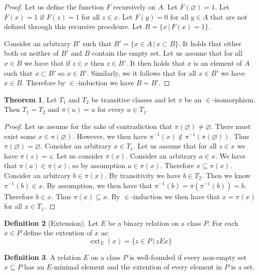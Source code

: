 \documentclass{article}
\theoremstyle{definition}
\newtheorem{thm}{Theorem}[section]
\newtheorem{defn}[thm]{Definition}
\newcommand*{\mtset}{\ensuremath{\varnothing}}
\DeclareMathOperator{\ext}{ext}
\begin{document}
\begin{proof}
    Let us define the function $F$ recursively on $A$. Let $F(\mtset) = 1$. Let $F(x) = 1$ if $F(z) = 1$ for all $z \in x$. Let $F(y) = 0$ for all $y \in A$ that are not defined through this recursive procdeure. Let $B = \{ x \, | \, F(x) = 1 \}$.

    Consider an arbitrary $B'$ such that $B' = \{ x \in A \, | \, x \subset B \}$. It holds that either both or neither of $B'$ and $B$ contain the empty set. Let us assume that for all $x \in B$ we have that if $z \in x$ then $z \in B'$. It then holds that $x$ is an element of $A$ such that $x \subset B'$ so $x \in B'$. Similarly, we it follows that for all $x \in B'$ we have $x \in B$. Therefore by $\in$-induction we have $B = B'$.
\end{proof}

\begin{thm}
    Let $T_1$ and $T_2$ be transitive classes and let $\pi$ be an $\in$-isomorphism. Then $T_1 = T_2$ and $\pi(u) = u$ for every $u \in T_1$.
\end{thm}

\begin{proof}
    Let us assume for the sake of contradiction that $\pi(\mtset) \ne \mtset$. There must exist some $x \in \pi(\mtset)$. However, we then have $\pi^{-1}(x) \not\in \pi^{-1}(\pi(\mtset))$. Thus $\pi(\mtset) = \mtset$. Consider an arbitrary $x \in T_1$. Let us assume that for all $z \in x$ we have $\pi(z) = z$. Let us consider $\pi(x)$. Consider an arbitrary $a \in x$. We have that $\pi(a) \in \pi(x)$, so by assumption $a \in \pi(x)$. Therefore $x \subseteq \pi(x)$. Consider an arbitrary $b \in \pi(x)$. By transitivity we have $b \in T_2$. Then we know $\pi^{-1}(b) \in x$. By assumption, we then have that $\pi^{-1}(b) = \pi(\pi^{-1}(b)) = b$. Therefore $b \in x$. Thus $\pi(x) \subseteq x$. By $\in$-induction we then have that $x = \pi(x)$ for all $x \in T_1$.
\end{proof}

\begin{defn}[Extension]
    Let $E$ be a binary relation on a class $P$. For each $x \in P$ define the extention of $x$ as: 
    \[
        \ext_E(x) = \{ z \in P \, | \, z E x \}
    \]
\end{defn}

\begin{defn}
    A relation $E$ on a class $P$ is well-founded if every non-empty set $x \subseteq P$ has an $E$-minimal element and the extention of every element in $P$ is a set.
\end{defn}
\end{document}

